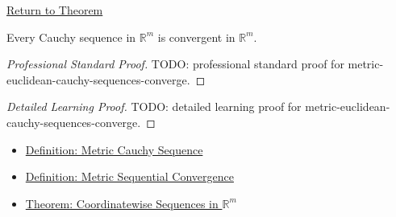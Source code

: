 \newpage
{}
\label{prf:metric-euclidean-cauchy-sequences-converge}

\begin{remark*}[Return]
\hyperref[thm:metric-euclidean-cauchy-sequences-converge]{Return to Theorem}
\end{remark*}

\begin{theorem*}
Every Cauchy sequence in \(\mathbb{R}^m\) is convergent in \(\mathbb{R}^m\).
\end{theorem*}

\begin{proof}[Professional Standard Proof]
\LRAProofBodyStart
TODO: professional standard proof for metric-euclidean-cauchy-sequences-converge.
\end{proof}

\begin{proof}[Detailed Learning Proof]
\LRAProofBodyStart
TODO: detailed learning proof for metric-euclidean-cauchy-sequences-converge.
\end{proof}

\begin{remark*}
\end{remark*}

\begin{dependencies}
\begin{itemize}
  \item \hyperref[def:metric-cauchy-sequence]{Definition: Metric Cauchy Sequence}
  \item \hyperref[def:metric-sequential-convergence]{Definition: Metric Sequential Convergence}
  \item \hyperref[thm:metric-euclidean-coordinatewise-sequences]{Theorem: Coordinatewise Sequences in \(\mathbb{R}^m\)}
\end{itemize}
\end{dependencies}

\clearpage
